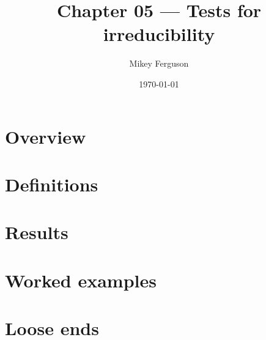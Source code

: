 \documentclass[11pt]{article}
\title{Chapter 05 --- Tests for irreducibility}
\author{Mikey Ferguson}
\date{\today}
\begin{document}
\maketitle
\tableofcontents
\bigskip

\section{Overview}

\section{Definitions}

\section{Results}

\section{Worked examples}

\section{Loose ends}
\end{document}

